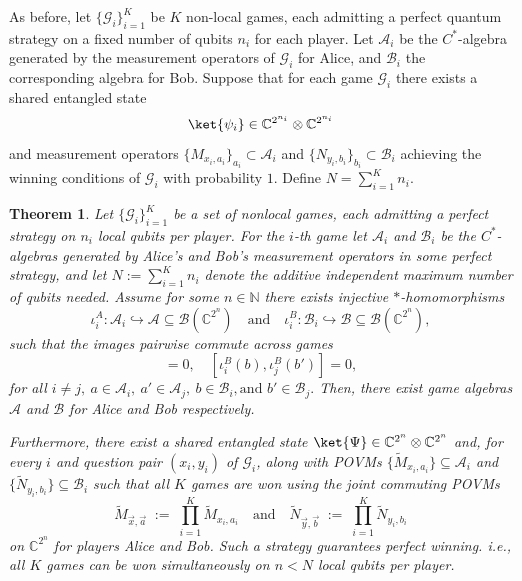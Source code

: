 \documentclass{article}
\newtheorem{theorem}{Theorem}
\begin{document}
    As before, let $\{\mathcal{G}_i\}_{i=1}^K$ be $K$ non-local games, each admitting a perfect quantum strategy on a fixed number of qubits $n_i$ for each player. 
    Let $\mathcal{A}_i$ be the $C^*$-algebra generated by the measurement operators of $\mathcal{G}_i$ for Alice, and $\mathcal{B}_i$ the corresponding algebra for Bob. 
    Suppose that for each game $\mathcal{G}_i$ there exists a shared entangled state 
    \begin{equation}
        \ket{\psi_i} \in \mathbb{C}^{2^{n_i}} \otimes \mathbb{C}^{2^{n_i}}
    \end{equation}
    and measurement operators $\{M_{x_i,a_i}\}_{a_i} \subset \mathcal{A}_i$ and $\{N_{y_i,b_i}\}_{b_i} \subset \mathcal{B}_i$ 
    achieving the winning conditions of $\mathcal{G}_i$ with probability $1$.  Define $N=\sum\limits_{i=1}^K n_i$. 
    
    \begin{theorem}\label{theorem: all games}
        Let $\{\mathcal{G}_i\}_{i=1}^K$ be a set of nonlocal games, each admitting a perfect strategy on $n_i$ local qubits per player. For the $i$-th game let $\mathcal{A}_i$ and $\mathcal{B}_i$ be the $C^*$-algebras generated by Alice's and Bob's measurement operators in some perfect strategy, and let $N:=\sum_{i=1}^K n_i$ denote the additive independent maximum number of qubits needed. Assume for some $n\in\mathbb{N}$ there exists injective $*$-homomorphisms
        \begin{equation}
           \iota_i^A:\mathcal{A}_i\hookrightarrow \mathcal{A}\subseteq\mathcal{B}(\mathbb{C}^{2^n}) \quad\text{and}\quad
            \iota_i^B:\mathcal{B}_i\hookrightarrow \mathcal{B}\subseteq\mathcal{B}(\mathbb{C}^{2^n}), 
        \end{equation}
        such that the images pairwise commute across games
        \begin{equation}
            [\iota_i^A(a),\iota_j^A(a')]=0,\quad [\iota_i^B(b),\iota_j^B(b')]=0,
        \end{equation}
        for all $ i\neq j,\ a\in\mathcal{A}_i,\ a'\in\mathcal{A}_j,\ b\in\mathcal{B}_i, \text{and } b'\in\mathcal{B}_j.$
        Then, there exist game algebras $\mathcal{A}$ and $\mathcal{B}$ for Alice and Bob respectively. 

        Furthermore, there exist a shared entangled state $\ket{\Psi}\in\mathbb{C}^{2^n}\otimes\mathbb{C}^{2^n}$ and, for every $i$ and question pair $(x_i,y_i)$ of $\mathcal{G}_i$, along with POVMs $\{\widetilde M_{x_i,a_i}\} \subseteq\mathcal{A}_i$ and $\{\widetilde N_{y_i,b_i}\} \subseteq\mathcal{B}_i$ such that all $K$ games are won using the joint commuting POVMs
        \begin{equation}
            \widetilde M_{\vec{x},\vec{a}}\;:=\;\prod_{i=1}^K \widetilde M_{x_i,a_i} \quad\text{and}\quad \widetilde N_{\vec{y},\vec{b}}\;:=\;\prod_{i=1}^K \widetilde N_{y_i,b_i}
        \end{equation}
        on $\mathbb{C}^{2^n}$ for players Alice and Bob. Such a strategy guarantees perfect winning. i.e., all $K$ games can be won simultaneously on $n<N$ local qubits per player.  
    \end{theorem}
\end{document}
